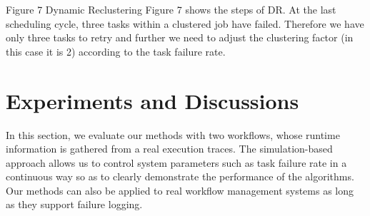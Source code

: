 \documentclass{IOS-Book-Article}
\begin{document}
Figure 7	Dynamic Reclustering
Figure 7 shows the steps of DR. At the last scheduling cycle, three tasks within a clustered job have failed. Therefore we have only three tasks to retry and further we need to adjust the clustering factor (in this case it is 2) according to the task failure rate. 

\section{Experiments and Discussions}

In this section, we evaluate our methods with two workflows, whose runtime information is gathered from a real execution traces. The simulation-based approach allows us to control system parameters such as task failure rate in a continuous way so as to clearly demonstrate the performance of the algorithms. Our methods can also be applied to real workflow management systems as long as they support failure logging. 
\end{document}
